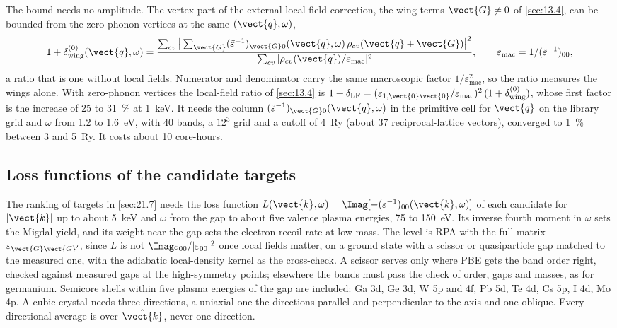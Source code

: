 The bound needs no amplitude. The vertex part of the external local-field correction, the wing terms $\vect{G} \neq 0$ of \cref{sec:13.4}, can be bounded from the zero-phonon vertices at the same $(\vect{q},\omega)$,
\begin{equation}
  1 + \delta_{\mathrm{wing}}^{(0)}(\vect{q},\omega) = \frac{\sum_{cv}\big|\sum_{\vect{G}}(\tilde\varepsilon^{-1})_{\vect{G}0}(\vect{q},\omega)\,\rho_{cv}(\vect{q}+\vect{G})\big|^2}{\sum_{cv}|\rho_{cv}(\vect{q})/\varepsilon_{\mathrm{mac}}|^2} , \qquad \varepsilon_{\mathrm{mac}} = 1/(\tilde\varepsilon^{-1})_{00} ,
  \label{eq:E.16-dLF}
\end{equation}
a ratio that is one without local fields. Numerator and denominator carry the same macroscopic factor $1/\varepsilon_{\mathrm{mac}}^2$, so the ratio measures the wings alone. With zero-phonon vertices the local-field ratio of \cref{sec:13.4} is $1 + \delta_{\mathrm{LF}} = (\varepsilon_{1,\vect{0}\vect{0}}/\varepsilon_{\mathrm{mac}})^2\,(1 + \delta_{\mathrm{wing}}^{(0)})$, whose first factor is the increase of 25 to \SI{31}{\percent} at \SI{1}{keV}. It needs the column $(\tilde\varepsilon^{-1})_{\vect{G}0}(\vect{q},\omega)$ in the primitive cell for $\vect{q}$ on the library grid and $\omega$ from 1.2 to \SI{1.6}{eV}, with 40 bands, a $12^3$ grid and a cutoff of \SI{4}{Ry} (about 37 reciprocal-lattice vectors), converged to \SI{1}{\percent} between 3 and \SI{5}{Ry}. It costs about 10 core-hours.

\subsection{Loss functions of the candidate targets}

The ranking of targets in \cref{sec:21.7} needs the loss function $L(\vect{k},\omega) = \Imag[-(\varepsilon^{-1})_{00}(\vect{k},\omega)]$ of each candidate for $|\vect{k}|$ up to about \SI{5}{keV} and $\omega$ from the gap to about five valence plasma energies, 75 to \SI{150}{eV}. Its inverse fourth moment in $\omega$ sets the Migdal yield, and its weight near the gap sets the electron-recoil rate at low mass. The level is RPA with the full matrix $\varepsilon_{\vect{G}\vect{G}'}$, since $L$ is not $\Imag\varepsilon_{00}/|\varepsilon_{00}|^2$ once local fields matter, on a ground state with a scissor or quasiparticle gap matched to the measured one, with the adiabatic local-density kernel as the cross-check. A scissor serves only where PBE gets the band order right, checked against measured gaps at the high-symmetry points; elsewhere the bands must pass the check of order, gaps and masses, as for germanium. Semicore shells within five plasma energies of the gap are included: Ga 3d, Ge 3d, W 5p and 4f, Pb 5d, Te 4d, Cs 5p, I 4d, Mo 4p. A cubic crystal needs three directions, a uniaxial one the directions parallel and perpendicular to the axis and one oblique. Every directional average is over $\hat{\vect{k}}$, never one direction.

